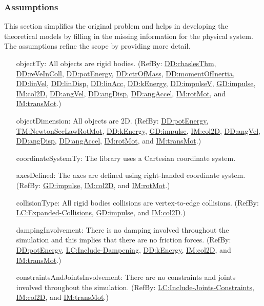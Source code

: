 \documentclass[12pt]{article}
\begin{document}
\subsubsection{Assumptions}
\label{Sec:Assumps}
This section simplifies the original problem and helps in developing the theoretical models by filling in the missing information for the physical system. The assumptions refine the scope by providing more detail.

\begin{itemize}
\item[objectTy:\phantomsection\label{assumpOT}]{All objects are rigid bodies. (RefBy: \hyperref[DD:chaslesThm]{DD:chaslesThm}, \hyperref[DD:reVeInColl]{DD:reVeInColl}, \hyperref[DD:potEnergy]{DD:potEnergy}, \hyperref[DD:ctrOfMass]{DD:ctrOfMass}, \hyperref[DD:momentOfInertia]{DD:momentOfInertia}, \hyperref[DD:linVel]{DD:linVel}, \hyperref[DD:linDisp]{DD:linDisp}, \hyperref[DD:linAcc]{DD:linAcc}, \hyperref[DD:kEnergy]{DD:kEnergy}, \hyperref[DD:impulseV]{DD:impulseV}, \hyperref[GD:impulse]{GD:impulse}, \hyperref[IM:col2D]{IM:col2D}, \hyperref[DD:angVel]{DD:angVel}, \hyperref[DD:angDisp]{DD:angDisp}, \hyperref[DD:angAccel]{DD:angAccel}, \hyperref[IM:rotMot]{IM:rotMot}, and \hyperref[IM:transMot]{IM:transMot}.)}
\item[objectDimension:\phantomsection\label{assumpOD}]{All objects are 2D. (RefBy: \hyperref[DD:potEnergy]{DD:potEnergy}, \hyperref[TM:NewtonSecLawRotMot]{TM:NewtonSecLawRotMot}, \hyperref[DD:kEnergy]{DD:kEnergy}, \hyperref[GD:impulse]{GD:impulse}, \hyperref[IM:col2D]{IM:col2D}, \hyperref[DD:angVel]{DD:angVel}, \hyperref[DD:angDisp]{DD:angDisp}, \hyperref[DD:angAccel]{DD:angAccel}, \hyperref[IM:rotMot]{IM:rotMot}, and \hyperref[IM:transMot]{IM:transMot}.)}
\item[coordinateSystemTy:\phantomsection\label{assumpCST}]{The library uses a Cartesian coordinate system.}
\item[axesDefined:\phantomsection\label{assumpAD}]{The axes are defined using right-handed coordinate system. (RefBy: \hyperref[GD:impulse]{GD:impulse}, \hyperref[IM:col2D]{IM:col2D}, and \hyperref[IM:rotMot]{IM:rotMot}.)}
\item[collisionType:\phantomsection\label{assumpCT}]{All rigid bodies collisions are vertex-to-edge collisions. (RefBy: \hyperref[lcEC]{LC:Expanded-Collisions}, \hyperref[GD:impulse]{GD:impulse}, and \hyperref[IM:col2D]{IM:col2D}.)}
\item[dampingInvolvement:\phantomsection\label{assumpDI}]{There is no damping involved throughout the simulation and this implies that there are no friction forces. (RefBy: \hyperref[DD:potEnergy]{DD:potEnergy}, \hyperref[lcID]{LC:Include-Dampening}, \hyperref[DD:kEnergy]{DD:kEnergy}, \hyperref[IM:col2D]{IM:col2D}, and \hyperref[IM:transMot]{IM:transMot}.)}
\item[constraintsAndJointsInvolvement:\phantomsection\label{assumpCAJI}]{There are no constraints and joints involved throughout the simulation. (RefBy: \hyperref[lcIJC]{LC:Include-Joints-Constraints}, \hyperref[IM:col2D]{IM:col2D}, and \hyperref[IM:transMot]{IM:transMot}.)}
\end{itemize}
\end{document}
